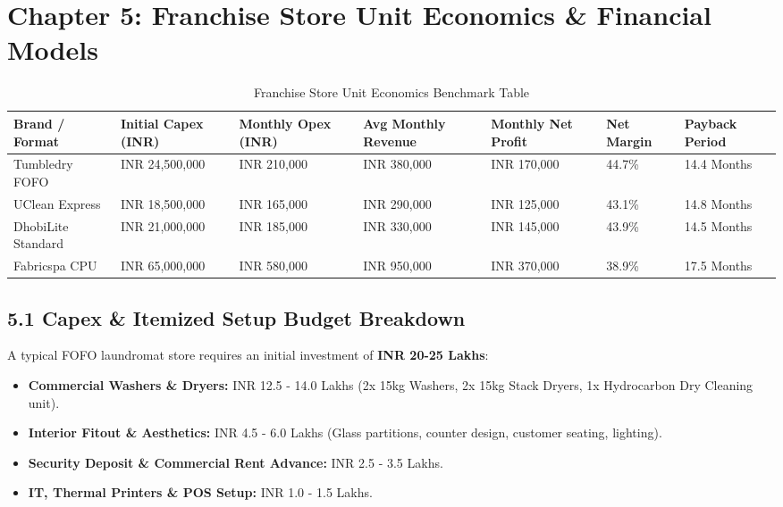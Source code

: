 \documentclass[11pt,a4paper]{article}
\begin{document}
\clearpage

\section{Chapter 5: Franchise Store Unit Economics \& Financial Models}

\begin{table}[h!]
\centering
\small
\begin{tabularx}{\textwidth}{XXXXXXX}
\toprule
\textbf{Brand / Format} & \textbf{Initial Capex (INR)} & \textbf{Monthly Opex (INR)} & \textbf{Avg Monthly Revenue} & \textbf{Monthly Net Profit} & \textbf{Net Margin} & \textbf{Payback Period} \\
\midrule
Tumbledry FOFO & INR 24,500,000 & INR 210,000 & INR 380,000 & INR 170,000 & 44.7\% & 14.4 Months \\
UClean Express & INR 18,500,000 & INR 165,000 & INR 290,000 & INR 125,000 & 43.1\% & 14.8 Months \\
DhobiLite Standard & INR 21,000,000 & INR 185,000 & INR 330,000 & INR 145,000 & 43.9\% & 14.5 Months \\
Fabricspa CPU & INR 65,000,000 & INR 580,000 & INR 950,000 & INR 370,000 & 38.9\% & 17.5 Months \\
\bottomrule
\end{tabularx}
\caption{Franchise Store Unit Economics Benchmark Table}
\end{table}

\subsection{5.1 Capex \& Itemized Setup Budget Breakdown}
A typical FOFO laundromat store requires an initial investment of \textbf{INR 20-25 Lakhs}:
\begin{itemize}
    \item \textbf{Commercial Washers \& Dryers:} INR 12.5 - 14.0 Lakhs (2x 15kg Washers, 2x 15kg Stack Dryers, 1x Hydrocarbon Dry Cleaning unit).
    \item \textbf{Interior Fitout \& Aesthetics:} INR 4.5 - 6.0 Lakhs (Glass partitions, counter design, customer seating, lighting).
    \item \textbf{Security Deposit \& Commercial Rent Advance:} INR 2.5 - 3.5 Lakhs.
    \item \textbf{IT, Thermal Printers \& POS Setup:} INR 1.0 - 1.5 Lakhs.
\end{itemize}
\end{document}
